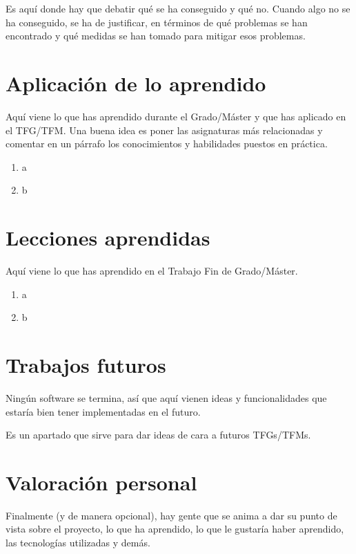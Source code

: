 \documentclass[a4paper, 12pt]{book}
\begin{document}
Es aquí donde hay que debatir qué se ha conseguido y qué no. Cuando algo no
se ha conseguido, se ha de justificar, en términos de qué problemas se han
encontrado y qué medidas se han tomado para mitigar esos problemas.


\section{Aplicación de lo aprendido}
\label{sec:aplicacion}

Aquí viene lo que has aprendido durante el Grado/Máster y que has aplicado
en el TFG/TFM. Una buena idea es poner las asignaturas más relacionadas y
comentar en un párrafo los conocimientos y habilidades puestos en práctica.

\begin{enumerate}
  \item a
  \item b
\end{enumerate}


\section{Lecciones aprendidas}
\label{sec:lecciones_aprendidas}

Aquí viene lo que has aprendido en el Trabajo Fin de Grado/Máster.

\begin{enumerate}
  \item a
  \item b
\end{enumerate}


\section{Trabajos futuros}
\label{sec:trabajos_futuros}

Ningún software se termina, así que aquí vienen ideas y funcionalidades
que estaría bien tener implementadas en el futuro.

Es un apartado que sirve para dar ideas de cara a futuros TFGs/TFMs.


\section{Valoración personal}
\label{sec:valoracion}

Finalmente (y de manera opcional), hay gente que se anima a dar su punto de
vista sobre el proyecto, lo que ha aprendido, lo que le gustaría haber aprendido,
las tecnologías utilizadas y demás.
\end{document}

